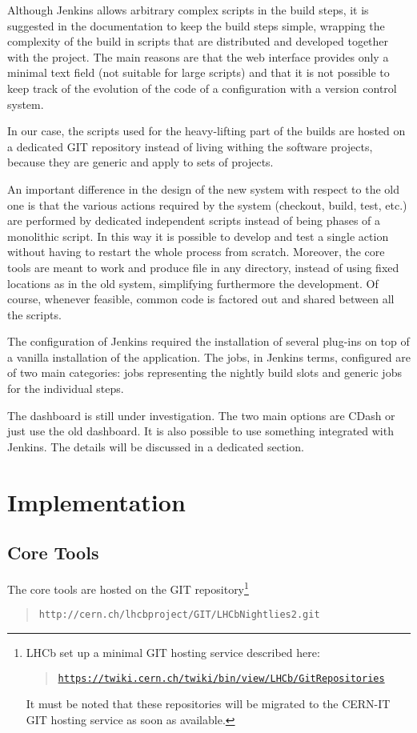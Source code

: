 \documentclass{lhcbnote}
\newcommand{\link}[2]{\href{#1}{#2}}
\newcommand{\urlLink}[1]{\link{#1}{\texttt{#1}}}
\begin{document}
Although Jenkins allows arbitrary complex scripts in the build steps, it is
suggested in the documentation to keep the build steps simple, wrapping the
complexity of the build in scripts that are distributed and developed together
with the project.  The main reasons are that the web interface provides only a
minimal text field (not suitable for large scripts) and that it is not possible
to keep track of the evolution of the code of a configuration with a version
control system.

In our case, the scripts used for the heavy-lifting part of the builds are
hosted on a dedicated GIT\cite{GIT} repository instead of living withing the
software projects, because they are generic and apply to sets of projects.

An important difference in the design of the new system with respect to the old
one is that the various actions required by the system (checkout, build, test,
etc.) are performed by dedicated independent scripts instead of being phases of
a monolithic script.  In this way it is possible to develop and test a single
action without having to restart the whole process from scratch.  Moreover, the
core tools are meant to work and produce file in any directory, instead of using
fixed locations as in the old system, simplifying furthermore the development.
Of course, whenever feasible, common code is factored out and shared between all
the scripts.

The configuration of Jenkins required the installation of several plug-ins on
top of a vanilla installation of the application.  The jobs, in Jenkins terms,
configured are of two main categories: jobs representing the nightly build slots
and generic jobs for the individual steps.

The dashboard is still under investigation.  The two main options are
CDash\cite{CDash} or just use the old dashboard.  It is also possible to use
something integrated with Jenkins.  The details will be discussed in a dedicated
section.

\section{Implementation}
\subsection{Core Tools}
\label{CoreTools}
The core tools are hosted on the GIT repository\footnote{%
  LHCb set up a minimal GIT hosting service described here:
  \begin{quote}
    \urlLink{https://twiki.cern.ch/twiki/bin/view/LHCb/GitRepositories}
  \end{quote}
  It must be noted that these repositories will be migrated to the CERN-IT GIT
  hosting service as soon as available.}
\begin{quote}
  \texttt{http://cern.ch/lhcbproject/GIT/LHCbNightlies2.git}
\end{quote}
\end{document}
